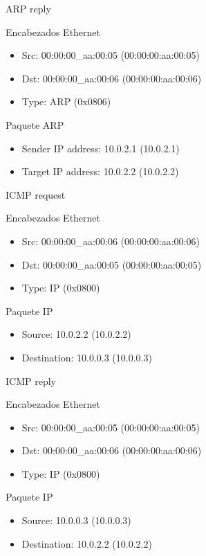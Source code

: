 \documentclass[a4paper,11pt]{article} %
\begin{document}
\setlength{\leftskip}{1cm}ARP reply

\indent\indent Encabezados Ethernet
\begin{itemize}
    \setlength{\itemindent}{80px}
    \item Src: 00:00:00\_aa:00:05 (00:00:00:aa:00:05)
    \item Dst: 00:00:00\_aa:00:06 (00:00:00:aa:00:06)
    \item Type: ARP (0x0806)
\end{itemize}

\indent\indent Paquete ARP
\begin{itemize}
    \setlength{\itemindent}{80px}
    \item Sender IP address: 10.0.2.1 (10.0.2.1)
    \item Target IP address: 10.0.2.2 (10.0.2.2)
\end{itemize}

\setlength{\leftskip}{1cm}ICMP request

\indent\indent Encabezados Ethernet
\begin{itemize}
    \setlength{\itemindent}{80px}
    \item Src: 00:00:00\_aa:00:06 (00:00:00:aa:00:06)
    \item Dst: 00:00:00\_aa:00:05 (00:00:00:aa:00:05)
    \item Type: IP (0x0800)
\end{itemize}

\indent\indent Paquete IP
\begin{itemize}
    \setlength{\itemindent}{80px}
    \item Source: 10.0.2.2 (10.0.2.2)
    \item Destination: 10.0.0.3 (10.0.0.3)
\end{itemize}

\setlength{\leftskip}{1cm}ICMP reply

\indent\indent Encabezados Ethernet
\begin{itemize}
    \setlength{\itemindent}{80px}
    \item Src: 00:00:00\_aa:00:05 (00:00:00:aa:00:05)
    \item Dst: 00:00:00\_aa:00:06 (00:00:00:aa:00:06)
    \item Type: IP (0x0800)
\end{itemize}

\indent\indent Paquete IP
\begin{itemize}
    \setlength{\itemindent}{80px}
    \item Source: 10.0.0.3 (10.0.0.3)
    \item Destination: 10.0.2.2 (10.0.2.2)
\end{itemize}
\end{document}
